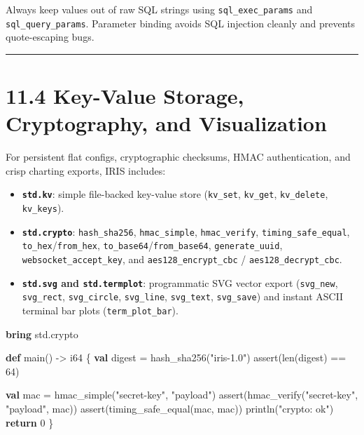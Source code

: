 \documentclass[
  english,
  oneside]{book}
\newenvironment{Shaded}{\begin{snugshade}}{\end{snugshade}}
\newcommand{\ControlFlowTok}[1]{\textcolor[rgb]{0.77,0.53,0.75}{\textbf{#1}}}
\newcommand{\DataTypeTok}[1]{\textcolor[rgb]{0.31,0.79,0.69}{#1}}
\newcommand{\DecValTok}[1]{\textcolor[rgb]{0.71,0.81,0.66}{#1}}
\newcommand{\FunctionTok}[1]{\textcolor[rgb]{0.86,0.86,0.67}{#1}}
\newcommand{\KeywordTok}[1]{\textcolor[rgb]{0.34,0.61,0.84}{\textbf{#1}}}
\newcommand{\NormalTok}[1]{\textcolor[rgb]{0.83,0.83,0.83}{#1}}
\newcommand{\OperatorTok}[1]{\textcolor[rgb]{0.83,0.83,0.83}{#1}}
\newcommand{\StringTok}[1]{\textcolor[rgb]{0.81,0.57,0.47}{#1}}
\providecommand{\tightlist}{%
  \setlength{\itemsep}{0pt}\setlength{\parskip}{0pt}}
\begin{document}
Always keep values out of raw SQL strings using
\texttt{sql\_exec\_params} and \texttt{sql\_query\_params}. Parameter
binding avoids SQL injection cleanly and prevents quote-escaping bugs.

\begin{center}\rule{0.5\linewidth}{0.5pt}\end{center}

\section{11.4 Key-Value Storage, Cryptography, and
Visualization}\label{key-value-storage-cryptography-and-visualization}

For persistent flat configs, cryptographic checksums, HMAC
authentication, and crisp charting exports, IRIS includes:

\begin{itemize}
\tightlist
\item
  \textbf{\texttt{std.kv}}: simple file-backed key-value store
  (\texttt{kv\_set}, \texttt{kv\_get}, \texttt{kv\_delete},
  \texttt{kv\_keys}).
\item
  \textbf{\texttt{std.crypto}}: \texttt{hash\_sha256},
  \texttt{hmac\_simple}, \texttt{hmac\_verify},
  \texttt{timing\_safe\_equal}, \texttt{to\_hex}/\texttt{from\_hex},
  \texttt{to\_base64}/\texttt{from\_base64}, \texttt{generate\_uuid},
  \texttt{websocket\_accept\_key}, and \texttt{aes128\_encrypt\_cbc} /
  \texttt{aes128\_decrypt\_cbc}.
\item
  \textbf{\texttt{std.svg} and \texttt{std.termplot}}: programmatic SVG
  vector export (\texttt{svg\_new}, \texttt{svg\_rect},
  \texttt{svg\_circle}, \texttt{svg\_line}, \texttt{svg\_text},
  \texttt{svg\_save}) and instant ASCII terminal bar plots
  (\texttt{term\_plot\_bar}).
\end{itemize}

\begin{Shaded}
\begin{Highlighting}[]
\KeywordTok{bring}\NormalTok{ std}\OperatorTok{.}\NormalTok{crypto}

\KeywordTok{def}\NormalTok{ main() }\OperatorTok{{-}\textgreater{}} \DataTypeTok{i64}\NormalTok{ \{}
    \KeywordTok{val}\NormalTok{ digest }\OperatorTok{=}\NormalTok{ hash\_sha256(}\StringTok{"iris{-}1.0"}\NormalTok{)}
    \FunctionTok{assert}\NormalTok{(}\FunctionTok{len}\NormalTok{(digest) }\OperatorTok{==} \DecValTok{64}\NormalTok{)}

    \KeywordTok{val}\NormalTok{ mac }\OperatorTok{=}\NormalTok{ hmac\_simple(}\StringTok{"secret{-}key"}\NormalTok{, }\StringTok{"payload"}\NormalTok{)}
    \FunctionTok{assert}\NormalTok{(hmac\_verify(}\StringTok{"secret{-}key"}\NormalTok{, }\StringTok{"payload"}\NormalTok{, mac))}
    \FunctionTok{assert}\NormalTok{(timing\_safe\_equal(mac, mac))}
\NormalTok{    println(}\StringTok{"crypto: ok"}\NormalTok{)}
    \ControlFlowTok{return} \DecValTok{0}
\NormalTok{\}}
\end{Highlighting}
\end{Shaded}
\end{document}
